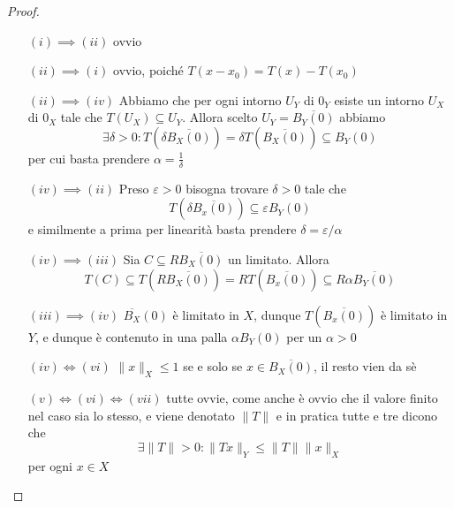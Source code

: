 \begin{proof}{} \( \)
\begin{itemize}[label = --]
    \item[\((i) \implies (ii)\)] ovvio
    \item[\((ii)\implies (i)\) ] ovvio, poiché \(T{(x-x_{0})} = T{(x)} - T{(x_{0})}\) 
    \item[\((ii) \implies (iv)\)] Abbiamo che per ogni intorno \(U_Y\) di \(0_Y\) esiste un intorno \(U_X\) di \(0_X\) tale che \(T{(U_X)} \subseteq U_Y \). Allora scelto \(U_Y = \overline{B_Y{(0)}}\) abbiamo
        \[
          \exists \delta > 0 : T{(\delta\overline{B_X{(0)}})} = \delta T{(\overline{B_X{(0)}})}\subseteq B_Y{(0)} 
        \]
        per cui basta prendere \(\alpha = \frac{1}{\delta}\) 
    \item[\((iv) \implies (ii)\)] Preso \(\varepsilon > 0\) bisogna trovare \(\delta>0\) tale che 
        \[
          T{(\delta \overline{B_x{(0)}})} \subseteq \varepsilon B_Y{(0)} 
        \]
        e similmente a prima per linearità basta prendere \(\delta = \varepsilon / \alpha\) 
    \item[\((iv) \implies (iii)\)] Sia \(C \subseteq R \overline{B_X{(0)}} \) un
        limitato. Allora
        \[
          T{(C)} \subseteq T{(R \overline{B_X{(0)}})} = RT{(\overline{B_x{(0)}})} \subseteq R \alpha \overline{B_Y{(0)}}  
        \]
    \item[\((iii) \implies (iv)\)] \(\overline{B_X}{(0)}\) è limitato in \(X\),
        dunque \(T{(\overline{B_x{(0)}})}\) è limitato in \(Y\), e dunque è
        contenuto in una palla \(\alpha B_Y{(0)}\) per un \(\alpha > 0\) 
    \item[\((iv) \iff (vi)\)] \(\|x\|_X \le 1\) se e solo se \(x \in \overline{B_X{(0)}}\), il resto vien da sè
    \item[\((v) \iff (vi) \iff (vii)\)] tutte ovvie, come anche è ovvio che il
        valore finito nel caso sia lo stesso, e viene denotato \(\|T\| \) e in pratica tutte e tre dicono che \[\exists \|T\| > 0 : \|Tx\|_Y \le \|T\| \|x\|_X \] per ogni \(x \in X\) 
\end{itemize}
\end{proof}





